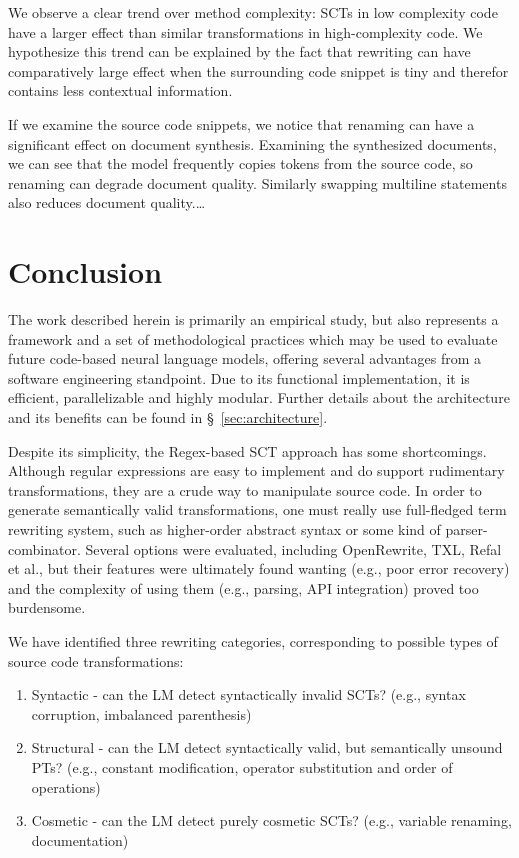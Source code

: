 \documentclass[sigconf,review,anonymous]{acmart}
\begin{document}
  We observe a clear trend over method complexity: SCTs in low complexity code have a larger effect than similar transformations in high-complexity code. We hypothesize this trend can be explained by the fact that rewriting can have comparatively large effect when the surrounding code snippet is tiny and therefor contains less contextual information.

  If we examine the source code snippets, we notice that renaming can have a significant effect on document synthesis. Examining the synthesized documents, we can see that the model frequently copies tokens from the source code, so renaming can degrade document quality. Similarly swapping multiline statements also reduces document quality.\ldots

  \section{Conclusion}\label{sec:conclusion}

  The work described herein is primarily an empirical study, but also represents a framework and a set of methodological practices which may be used to evaluate future code-based neural language models, offering several advantages from a software engineering standpoint. Due to its functional implementation, it is efficient, parallelizable and highly modular. Further details about the architecture and its benefits can be found in \S~\ref{sec:architecture}.

  Despite its simplicity, the Regex-based SCT approach has some shortcomings. Although regular expressions are easy to implement and do support rudimentary transformations, they are a crude way to manipulate source code. In order to generate semantically valid transformations, one must really use full-fledged term rewriting system, such as higher-order abstract syntax or some kind of parser-combinator. Several options were evaluated, including OpenRewrite, TXL, Refal et al., but their features were ultimately found wanting (e.g., poor error recovery) and the complexity of using them (e.g., parsing, API integration) proved too burdensome.

  We have identified three rewriting categories, corresponding to possible types of source code transformations:

  \begin{enumerate}
    \item Syntactic - can the LM detect syntactically invalid SCTs? (e.g., syntax corruption, imbalanced parenthesis)
    \item Structural - can the LM detect syntactically valid, but semantically unsound PTs? (e.g., constant modification, operator substitution and order of operations)
    \item Cosmetic - can the LM detect purely cosmetic SCTs? (e.g., variable renaming, documentation)
  \end{enumerate}
\end{document}
